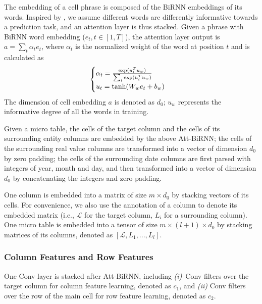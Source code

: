 \documentclass{article}
\begin{document}
The embedding of a cell phrase is composed of the BiRNN embeddings of its words.
Inspired by \cite{yang2016hierarchical}, 
we assume different words are differently informative towards a prediction task,
and an attention layer is thus stacked.
Given a phrase with BiRNN word embedding  ($e_t, t \in \left[1,T \right]$), 
the attention layer output is
$a = \sum_{t} \alpha_t e_t$, where $\alpha_t$ is the normalized weight of the word at position $t$ and is calculated as 
\vspace{-0.1cm}
\begin{equation}\label{eq:att}
\begin{cases}
\alpha_t = \frac{\text{exp}(u^T_t u_w)}{\sum_t \text{exp} (u^T_t u_w)} \\
u_t = \text{tanh} (W_w e_t + b_w) 
\end{cases}
\vspace{-0.02cm}
\end{equation}
The dimension of cell embedding $a$ is denoted as $d_0$;
$u_w$ represents the informative degree of all the words in training.

Given a micro table, the cells of the target column and the cells of its surrounding entity columns are embedded by the above Att-BiRNN;
the cells of the surrounding real value columns are transformed into a vector of dimension $d_0$ by zero padding;
the cells of the surrounding date columns are first parsed with integers of year, month and day,
and then transformed into a vector of dimension $d_0$ by concatenating the integers and zero padding.


One column is embedded into a matrix of size $m \times d_0$ by stacking vectors of its cells.
For convenience, we also use the annotation of a column 
to denote its embedded matrix (i.e., $\mathcal{L}$ for the target column, $L_i$ for a surrounding column).
One micro table is embedded into a tensor of size $m \times (l+1) \times d_0$ by stacking matrices of its columns, denoted as $\left[\mathcal{L}, L_1, ..., L_l \right]$.



\subsubsection{Column Features and Row Features}
One Conv layer is stacked after Att-BiRNN,
including
\textit{(i)}~Conv filters over the target column for column feature learning, denoted as $c_1$, 
and \textit{(ii)} Conv filters over the row of the main cell for row feature learning, denoted as $c_2$. 
\end{document}
